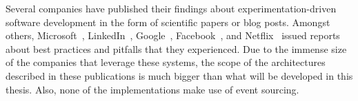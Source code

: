 Several companies have published their findings about experimentation-driven software development in the form of scientific papers or blog posts.
Amongst others, Microsoft~\cite{Kohavi2013}, LinkedIn~\cite{Xu2015}, Google~\cite{Tang2010}, Facebook~\cite{Bakshy2014}, and Netflix~\cite{WEB:Netflix:2016} issued reports about best practices and pitfalls that they experienced.
Due to the immense size of the companies that leverage these systems, the scope of the architectures described in these publications is much bigger than what will be developed in this thesis.
Also, none of the implementations make use of event sourcing.
